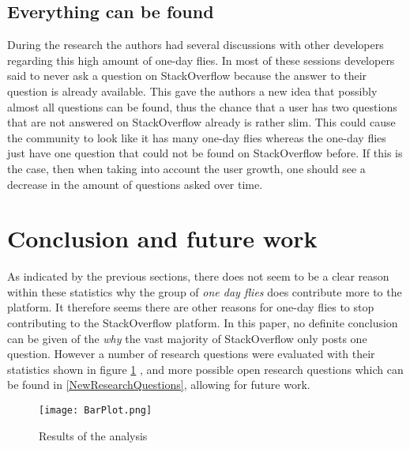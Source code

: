 \documentclass[conference]{IEEEtran}
\begin{document}
\subsection{Everything can be found}
During the research the authors had several discussions with other developers regarding this high amount of one-day flies. In most of these sessions developers said to never ask a question on StackOverflow because the answer to their question is already available. This gave the authors a new idea that possibly almost all questions can be found, thus the chance that a user has two questions that are not answered on StackOverflow already is rather slim. This could cause the community to look like it has many one-day flies whereas the one-day flies just have one question that could not be found on StackOverflow before. If this is the case, then when taking into account the user growth, one should see a decrease in the amount of questions asked over time. 

\section{Conclusion and future work}

As indicated by the previous sections, there does not seem to be a clear reason within these statistics why the group of \textit{one day flies} does contribute more to the platform. It therefore seems there are other reasons for one-day flies to stop contributing to the StackOverflow platform. In this paper, no definite conclusion can be given of the \textit{why} the vast majority of StackOverflow only posts one question. However a number of research questions were evaluated with their statistics shown in figure \ref{finalResults} , and more possible open research questions which can be found in \ref{NewResearchQuestions}, allowing for future work.

\begin{figure}[h]
 \texttt{[image: BarPlot.png]}
 \caption{Results of the analysis}
 \label{finalResults}
\end{figure}





\end{document}
